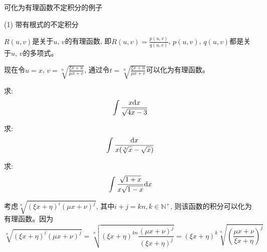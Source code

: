 可化为有理函数不定积分的例子

(1) 带有根式的不定积分

$R(u, v)$是关于$u$, $v$的有理函数, 即$R(u, v) = \frac{p(u, v)}{q(u, v)}$, $p(u, v)$, $q(u, v)$都是关于$u$, $v$的多项式。

现在令$u = x$, $v = \sqrt[n]{\frac{\xi x + u}{\mu x + v}}$, 通过令$t = \sqrt[n]{\frac{\xi x + u}{\mu x + v}}$可以化为有理函数。

\begin{example}
    求:
    \begin{equation*}
        \int \frac{x \mathrm{d} x}{\sqrt{4x-3}}
    \end{equation*}    
\end{example}
\begin{solution}
    
\end{solution}

\begin{example}
    求:
    \begin{equation*}
        \int \frac{\mathrm{d} x}{x(\sqrt[3]{x}-\sqrt{x})}
    \end{equation*}
\end{example}
\begin{solution}
    
\end{solution}

\begin{example}
    求:
    \begin{equation*}
        \int \frac{\sqrt{1+x}}{x\sqrt{1-x}} \mathrm{d} x
    \end{equation*}
\end{example}
\begin{solution}
    
\end{solution}

考虑$\sqrt[n]{(\xi x+\eta)^i(\mu x + \nu)^j}$, 其中$i + j = kn, k \in \mathbb{N}^+$, 则该函数的积分可以化为有理函数。因为
\begin{equation*}
    \sqrt[n]{(\xi x+\eta)^i(\mu x + \nu)^j} = \sqrt[n]{(\xi x+\eta)^{kn}\frac{(\mu x + \nu)^j}{(\xi x+\eta)^j}} = (\xi x+\eta)^k\sqrt[n]{\left(\frac{\mu x + \nu}{\xi x+\eta}\right)^j}
\end{equation*}